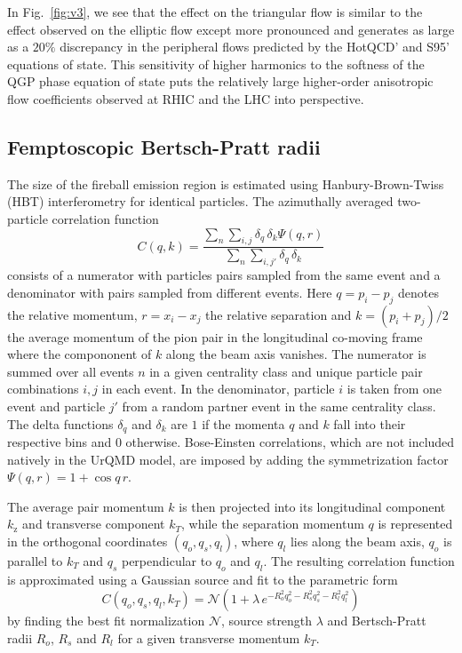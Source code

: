 \documentclass[aps,prc,reprint,amsmath,nofootinbib,superscriptaddress]{revtex4-1}
\begin{document}
In Fig.~\ref{fig:v3}, we see that the effect on the triangular flow is similar to the effect observed on the elliptic flow except more pronounced and generates as large as a $20\%$ discrepancy in the peripheral flows
predicted by the HotQCD' and S95' equations of state. This sensitivity of higher harmonics to the softness of the QGP phase equation of state puts the relatively large higher-order anisotropic flow coefficients observed at
RHIC and the LHC into perspective. 

\subsection{Femptoscopic Bertsch-Pratt radii}
\label{hbt}

The size of the fireball emission region is estimated using Hanbury-Brown-Twiss (HBT) interferometry for identical particles. The azimuthally averaged two-particle correlation function 
\begin{equation}
 \label{hbt}
 C(q, k) = \frac{\sum\limits_n \sum\limits_{i, j} \delta_{q} \, \delta_{k}\Psi(q,r)}{\sum\limits_{n} \sum\limits_{i,j'} \delta_{q} \, \delta_{k}}
\end{equation}
consists of a numerator with particles pairs sampled from the same event and a denominator with pairs sampled from different events. Here $q = p_i - p_j$ denotes the relative momentum, $r=x_i-x_j$ the relative separation and $k = (p_i + p_j)/2$ the average momentum of the pion pair in the longitudinal co-moving 
frame where the compononent of $k$ along the beam axis vanishes. The numerator is summed over all events $n$ in a given centrality class and unique particle pair combinations $i,j$ in each event. In the denominator, particle $i$ is
taken from one event and particle $j'$ from a random partner event in the same centrality class. The delta functions $\delta_q$ and $\delta_k$ are $1$ if the momenta $q$ and $k$ fall into their respective bins and $0$ otherwise. Bose-Einsten 
correlations, which are not included natively in the UrQMD model, are imposed by adding the symmetrization factor $\Psi(q,r) = 1 + \cos q\,r$. 

The average pair momentum $k$ is then projected into its longitudinal component $k_\text{z}$ and transverse component $k_T$, while the separation momentum $q$ is represented in the orthogonal coordinates 
$(q_o, q_s, q_l)$, where $q_l$ lies along the beam axis, $q_o$ is parallel to $k_T$ and $q_s$ perpendicular to $q_o$ and $q_l$. The resulting correlation function is approximated using a Gaussian source and 
fit to the parametric form
\begin{equation}
 \label{fitfunction}
 C(q_o, q_s, q_l, k_T) = \mathcal{N} \left(1 + \lambda\, e^{-R_o^2 q_o^2 - R_s^2 q_s^2 - R_l^2 q_l^2} \right) 
\end{equation}
by finding the best fit normalization $\mathcal{N}$, source strength $\lambda$ and Bertsch-Pratt radii $R_o$, $R_s$ and $R_l$ for a given transverse momentum $k_T$. 
\end{document}
